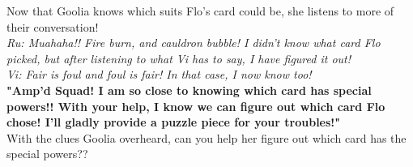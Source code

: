 


Now that Goolia knows which suits Flo's card could be, she listens to more of their conversation!\\

\textit{Ru: Muahaha!! Fire burn, and cauldron bubble! I didn't know what card Flo picked, but after listening to what Vi has to say, I have figured it out!}\\

\textit{Vi: Fair is foul and foul is fair! In that case, I now know too!}\\

\textbf{"Amp'd Squad! I am so close to knowing which card has special powers!! With your help, I know we can figure out which card Flo chose! I'll gladly provide a puzzle piece for your troubles!"}\\

With the clues Goolia overheard, can you help her figure out which card has the special powers??\\
